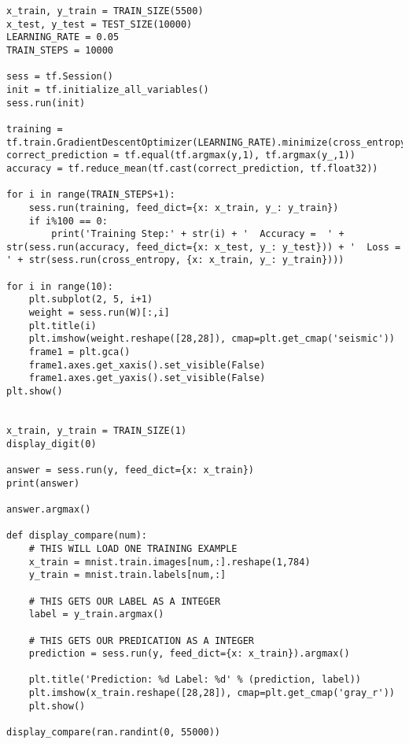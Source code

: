 \begin{lstlisting}
x_train, y_train = TRAIN_SIZE(5500)
x_test, y_test = TEST_SIZE(10000)
LEARNING_RATE = 0.05
TRAIN_STEPS = 10000

sess = tf.Session()
init = tf.initialize_all_variables()
sess.run(init)

training = tf.train.GradientDescentOptimizer(LEARNING_RATE).minimize(cross_entropy)
correct_prediction = tf.equal(tf.argmax(y,1), tf.argmax(y_,1))
accuracy = tf.reduce_mean(tf.cast(correct_prediction, tf.float32))

for i in range(TRAIN_STEPS+1):
    sess.run(training, feed_dict={x: x_train, y_: y_train})
    if i%100 == 0:
        print('Training Step:' + str(i) + '  Accuracy =  ' + str(sess.run(accuracy, feed_dict={x: x_test, y_: y_test})) + '  Loss = ' + str(sess.run(cross_entropy, {x: x_train, y_: y_train})))
    
for i in range(10):
    plt.subplot(2, 5, i+1)
    weight = sess.run(W)[:,i]
    plt.title(i)
    plt.imshow(weight.reshape([28,28]), cmap=plt.get_cmap('seismic'))
    frame1 = plt.gca()
    frame1.axes.get_xaxis().set_visible(False)
    frame1.axes.get_yaxis().set_visible(False) 
plt.show()


x_train, y_train = TRAIN_SIZE(1) 
display_digit(0)

answer = sess.run(y, feed_dict={x: x_train})
print(answer)

answer.argmax()

def display_compare(num):
    # THIS WILL LOAD ONE TRAINING EXAMPLE
    x_train = mnist.train.images[num,:].reshape(1,784)
    y_train = mnist.train.labels[num,:]
    
    # THIS GETS OUR LABEL AS A INTEGER
    label = y_train.argmax()
    
    # THIS GETS OUR PREDICATION AS A INTEGER
    prediction = sess.run(y, feed_dict={x: x_train}).argmax() 
    
    plt.title('Prediction: %d Label: %d' % (prediction, label))
    plt.imshow(x_train.reshape([28,28]), cmap=plt.get_cmap('gray_r'))
    plt.show()

display_compare(ran.randint(0, 55000))
\end{lstlisting}
